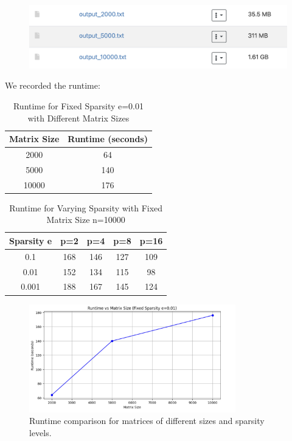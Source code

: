 \documentclass{article}
\begin{document}
\begin{figure}[H]
    \centering
    \includegraphics[width=0.75\linewidth]{Photos/Screenshot 2024-04-18 at 11.03.05.png}
\end{figure}
We recorded the runtime:
\begin{table}[H]
\centering
\caption{Runtime for Fixed Sparsity e=0.01 with Different Matrix Sizes}
\label{tab:fixed_sparsity}
\begin{tabular}{|c|c|}
\hline
\textbf{Matrix Size} & \textbf{Runtime (seconds)} \\ \hline
2000                 & 64                         \\ \hline
5000                 & 140                        \\ \hline
10000                & 176                        \\ \hline
\end{tabular}
\end{table}
\begin{table}[ht]
\centering
\caption{Runtime for Varying Sparsity with Fixed Matrix Size n=10000}
\label{tab:varied_sparsity}
\begin{tabular}{|c|c|c|c|c|}
\hline
\textbf{Sparsity e} & \textbf{p=2} & \textbf{p=4} & \textbf{p=8} & \textbf{p=16} \\ \hline
0.1                 & 168          & 146          & 127          & 109           \\ \hline
0.01                & 152          & 134          & 115          & 98            \\ \hline
0.001               & 188          & 167          & 145          & 124           \\ \hline
\end{tabular}
\end{table}

\begin{figure}[H]
    \centering
    \includegraphics[width=0.8\textwidth]{Photos/runtime1.png}
    \caption{Runtime comparison for matrices of different sizes and sparsity levels.}
    \label{fig:runtime}
\end{figure}
\end{document}
